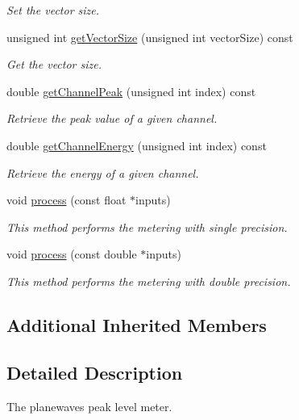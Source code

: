 \begin{DoxyCompactItemize}
\begin{DoxyCompactList}\small\item\em Set the vector size. \end{DoxyCompactList}\item 
unsigned int \hyperlink{class_hoa2_d_1_1_meter_af6336b9eaed75ec9b31405b28fe3f811}{get\-Vector\-Size} (unsigned int vector\-Size) const 
\begin{DoxyCompactList}\small\item\em Get the vector size. \end{DoxyCompactList}\item 
double \hyperlink{class_hoa2_d_1_1_meter_a3e697d8c692f5fa4484dd99cce866310}{get\-Channel\-Peak} (unsigned int index) const 
\begin{DoxyCompactList}\small\item\em Retrieve the peak value of a given channel. \end{DoxyCompactList}\item 
double \hyperlink{class_hoa2_d_1_1_meter_af2bd3c8691c6004e378ff17f12c88c29}{get\-Channel\-Energy} (unsigned int index) const 
\begin{DoxyCompactList}\small\item\em Retrieve the energy of a given channel. \end{DoxyCompactList}\item 
void \hyperlink{class_hoa2_d_1_1_meter_a1b05d443d17a910e7e9cc7b3f81badc6}{process} (const float $\ast$inputs)
\begin{DoxyCompactList}\small\item\em This method performs the metering with single precision. \end{DoxyCompactList}\item 
void \hyperlink{class_hoa2_d_1_1_meter_af523ed430333d4b861b117bda0bc6068}{process} (const double $\ast$inputs)
\begin{DoxyCompactList}\small\item\em This method performs the metering with double precision. \end{DoxyCompactList}\end{DoxyCompactItemize}
\subsection*{Additional Inherited Members}


\subsection{Detailed Description}
The planewaves peak level meter. 

